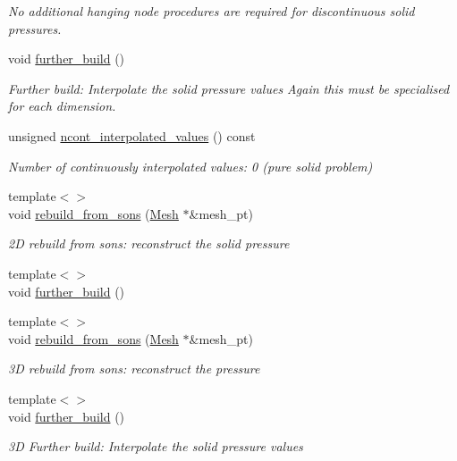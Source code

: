 \begin{DoxyCompactItemize}
\begin{DoxyCompactList}\small\item\em No additional hanging node procedures are required for discontinuous solid pressures. \end{DoxyCompactList}\item 
void \hyperlink{classoomph_1_1RefineableQPVDElementWithPressure_af2981a672382c6db25389aa7c82a6b30}{further\+\_\+build} ()
\begin{DoxyCompactList}\small\item\em Further build\+: Interpolate the solid pressure values Again this must be specialised for each dimension. \end{DoxyCompactList}\item 
unsigned \hyperlink{classoomph_1_1RefineableQPVDElementWithPressure_aa73ec04c55ee434543ee171bdd1da914}{ncont\+\_\+interpolated\+\_\+values} () const
\begin{DoxyCompactList}\small\item\em Number of continuously interpolated values\+: 0 (pure solid problem) \end{DoxyCompactList}\item 
{\footnotesize template$<$$>$ }\\void \hyperlink{classoomph_1_1RefineableQPVDElementWithPressure_ad001c7401c2f62c377926870eb01f3e3}{rebuild\+\_\+from\+\_\+sons} (\hyperlink{classoomph_1_1Mesh}{Mesh} $\ast$\&mesh\+\_\+pt)
\begin{DoxyCompactList}\small\item\em 2D rebuild from sons\+: reconstruct the solid pressure \end{DoxyCompactList}\item 
{\footnotesize template$<$$>$ }\\void \hyperlink{classoomph_1_1RefineableQPVDElementWithPressure_ab4406f1c6de1e8e2e704bd55a9409c87}{further\+\_\+build} ()
\item 
{\footnotesize template$<$$>$ }\\void \hyperlink{classoomph_1_1RefineableQPVDElementWithPressure_a11e3bc01af8930b5669bbaf27ab16a5c}{rebuild\+\_\+from\+\_\+sons} (\hyperlink{classoomph_1_1Mesh}{Mesh} $\ast$\&mesh\+\_\+pt)
\begin{DoxyCompactList}\small\item\em 3D rebuild from sons\+: reconstruct the pressure \end{DoxyCompactList}\item 
{\footnotesize template$<$$>$ }\\void \hyperlink{classoomph_1_1RefineableQPVDElementWithPressure_ab1e141199db731d930fd5b0a70b994b3}{further\+\_\+build} ()
\begin{DoxyCompactList}\small\item\em 3D Further build\+: Interpolate the solid pressure values \end{DoxyCompactList}\end{DoxyCompactItemize}
